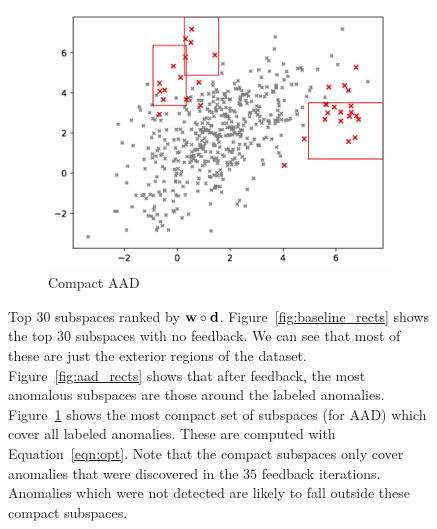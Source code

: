 \documentclass{article} %
\begin{document}
\begin{figure}
	\begin{subfigure}[b]{0.3\textwidth}
		\includegraphics[width=\textwidth]{top_30_anomalous_regions_100_trees_compact}
		\caption{Compact AAD}
		\label{fig:compact_rects}
	\end{subfigure}
	\caption{Top $30$ subspaces ranked by ${\bf w}\circ{\bf d}$. Figure~\ref{fig:baseline_rects} shows the top $30$ subspaces with no feedback. We can see that most of these are just the exterior regions of the dataset. Figure~\ref{fig:aad_rects} shows that after feedback, the most anomalous subspaces are those around the labeled anomalies. Figure~\ref{fig:compact_rects} shows the most compact set of subspaces (for AAD) which cover all labeled anomalies. These are computed with Equation~\ref{eqn:opt}. Note that the compact subspaces only cover anomalies that were discovered in the $35$ feedback iterations. Anomalies which were not detected are likely to fall outside these compact subspaces.} \label{fig:rects}
\end{figure}
\end{document}
